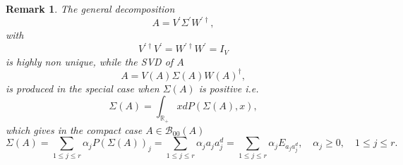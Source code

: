 \documentclass[aps,preprint]{revtex4}%
\newtheorem{remark}[theorem]{Remark}
\begin{document}
\begin{remark}
The general decomposition
\begin{equation}
A=V^{\prime}\Sigma^{\prime}W^{\prime\dagger},
\end{equation}
with
\begin{equation}
V^{\prime\dagger}V^{\prime}=W^{\prime\dagger}W^{\prime}=I_{V}%
\end{equation}
is highly non unique, while the SVD of $A$
\begin{equation}
A=V\left(  A\right)  \Sigma\left(  A\right)  W\left(  A\right)  ^{\dagger},
\end{equation}
is produced in the special case when $\Sigma\left(  A\right)  $ is positive
i.e.
\begin{equation}
\Sigma\left(  A\right)  =\int_{\mathbb{R}_{+}}xdP\left(  \Sigma\left(
A\right)  ,x\right)  ,
\end{equation}
which gives in the compact case $A\in\mathcal{B}_{00}\left(  A\right)  $
\begin{equation}
\Sigma\left(  A\right)  =\sum_{1\leq j\leq r}\alpha_{j}P\left(  \Sigma\left(
A\right)  \right)  _{j}=\sum_{1\leq j\leq r}\alpha_{j}a_{j}a_{j}^{d}%
=\sum_{1\leq j\leq r}\alpha_{j}E_{a_{j}a_{j}^{d}},\quad\alpha_{j}\geq
0,\quad1\leq j\leq r.
\end{equation}

\end{remark}
\end{document}
